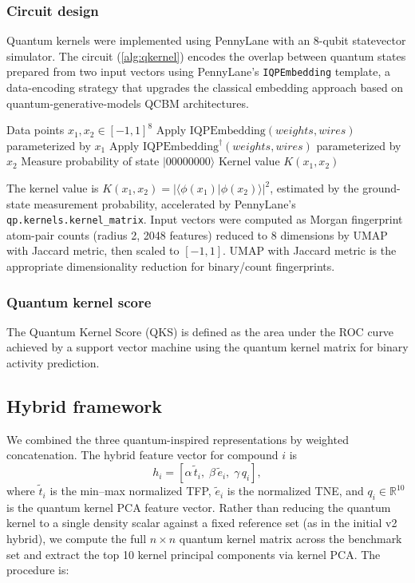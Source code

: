 \documentclass[11pt,a4paper]{article}
\begin{document}
\subsubsection{Circuit design}

Quantum kernels were implemented using PennyLane \citep{pennylane_2024} with an 8-qubit statevector simulator. The circuit (\cref{alg:qkernel}) encodes the overlap between quantum states prepared from two input vectors using PennyLane's \texttt{IQPEmbedding} template, a data-encoding strategy that upgrades the classical embedding approach based on quantum-generative-models QCBM architectures.

\begin{algorithm}[htbp]
\caption{Quantum kernel circuit for 8-qubit state overlap using PennyLane's \texttt{IQPEmbedding} template.}
\label{alg:qkernel}
\begin{algorithmic}[1]
\REQUIRE Data points $x_1, x_2 \in [-1, 1]^8$
\STATE Apply $\mathrm{IQPEmbedding}(weights, wires)$ parameterized by $x_1$
\STATE Apply $\mathrm{IQPEmbedding}^\dagger(weights, wires)$ parameterized by $x_2$
\STATE Measure probability of state $|00000000\rangle$
\RETURN Kernel value $K(x_1, x_2)$
\end{algorithmic}
\end{algorithm}

The kernel value is $K(x_1, x_2) = |\langle \phi(x_1) | \phi(x_2) \rangle|^2$, estimated by the ground-state measurement probability, accelerated by PennyLane's \texttt{qp.kernels.kernel\_matrix}. Input vectors were computed as Morgan fingerprint atom-pair counts (radius 2, \num{2048} features) reduced to 8 dimensions by UMAP with Jaccard metric, then scaled to $[-1, 1]$. UMAP with Jaccard metric is the appropriate dimensionality reduction for binary/count fingerprints.

\subsubsection{Quantum kernel score}

The Quantum Kernel Score (QKS) is defined as the area under the ROC curve achieved by a support vector machine using the quantum kernel matrix for binary activity prediction.

\subsection{Hybrid framework}

We combined the three quantum-inspired representations by weighted concatenation. The hybrid feature vector for compound $i$ is
\begin{equation}
h_i = \left[\alpha\,\tilde{t}_i,\; \beta\,\tilde{e}_i,\; \gamma\,q_i\right],
\end{equation}
where $\tilde{t}_i$ is the min--max normalized TFP, $\tilde{e}_i$ is the normalized TNE, and $q_i \in \mathbb{R}^{10}$ is the quantum kernel PCA feature vector. Rather than reducing the quantum kernel to a single density scalar against a fixed reference set (as in the initial v2 hybrid), we compute the full $n \times n$ quantum kernel matrix across the benchmark set and extract the top \num{10} kernel principal components via kernel PCA. The procedure is:
\end{document}
